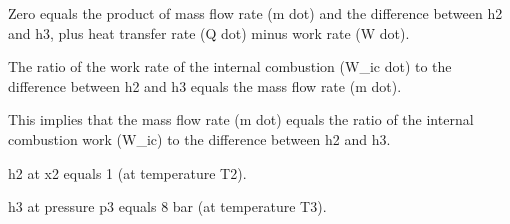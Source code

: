 Zero equals the product of mass flow rate (m dot) and the difference between h2 and h3, plus heat transfer rate (Q dot) minus work rate (W dot).

The ratio of the work rate of the internal combustion (W_ic dot) to the difference between h2 and h3 equals the mass flow rate (m dot).

This implies that the mass flow rate (m dot) equals the ratio of the internal combustion work (W_ic) to the difference between h2 and h3.

h2 at x2 equals 1 (at temperature T2).

h3 at pressure p3 equals 8 bar (at temperature T3).